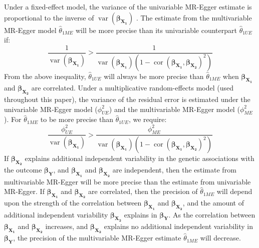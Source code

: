 \documentclass[a4paper,12pt]{article}
\DeclareMathOperator{\cor}{cor}
\DeclareMathOperator{\var}{var}
\begin{document}
{\begin{bibunit}[wileyj]
{Under a fixed-effect model, the variance of the univariable MR-Egger estimate is proportional to the inverse of $\var(\boldsymbol{\beta_{X_{1}}})$ \cite{bowden2017pleio}. The estimate from the multivariable MR-Egger model $\hat{\theta}_{1ME}$ will be more precise than its univariable counterpart $\hat{\theta}_{1UE}$ if:
\begin{equation}
\frac{1}{\var(\boldsymbol{\beta_{X_{1}}})}>\frac{1}{\var(\boldsymbol{\beta_{X_{1}}})(1-\cor(\boldsymbol{\beta_{X_{1}}},\boldsymbol{\beta_{X_{2}}})^{2})}
\end{equation}
From the above inequality, $\hat{\theta}_{1UE}$ will always be more precise than $\hat{\theta}_{1ME}$ when $\boldsymbol{\beta_{X_{1}}}$ and $\boldsymbol{\beta_{X_{2}}}$ are correlated.  Under a multiplicative random-effects model (used throughout this paper), the variance of the residual error is estimated under the univariable MR-Egger model ($\phi_{UE}^{2}$) and the multivariable MR-Egger model ($\phi_{ME}^{2}$). For $\hat{\theta}_{1ME}$ to be more precise than $\hat{\theta}_{1UE}$, we require:
\begin{equation}
\frac{\phi_{UE}^{2}}{\var(\boldsymbol{\beta_{X_{1}}})}>\frac{\phi_{ME}^{2}}{\var(\boldsymbol{\beta_{X_{1}}})(1-\cor(\boldsymbol{\beta_{X_{1}}},\boldsymbol{\beta_{X_{2}}})^{2})}
\end{equation}
If $\boldsymbol{\beta_{X_{2}}}$ explains additional independent variability in the genetic associations with the outcome $\boldsymbol{\beta_{Y}}$, and $\boldsymbol{\beta_{X_{1}}}$ and $\boldsymbol{\beta_{X_{2}}}$ are independent, then the estimate from multivariable MR-Egger will be more precise than the estimate from univariable MR-Egger.  If $\boldsymbol{\beta_{X_{1}}}$ and $\boldsymbol{\beta_{X_{2}}}$ are correlated, then the precision of $\hat{\theta}_{1ME}$ will depend upon the strength of the correlation between $\boldsymbol{\beta_{X_{1}}}$ and $\boldsymbol{\beta_{X_{2}}}$, and the amount of additional independent variability $\boldsymbol{\beta_{X_{2}}}$ explains in $\boldsymbol{\beta_{Y}}$.  As the correlation between $\boldsymbol{\beta_{X_{1}}}$ and $\boldsymbol{\beta_{X_{2}}}$ increases, and $\boldsymbol{\beta_{X_{2}}}$ explains no additional independent variability in $\boldsymbol{\beta_{Y}}$, the precision of the multivariable MR-Egger estimate $\hat{\theta}_{1ME}$ will decrease.  
}


\end{bibunit}}
\end{document}
